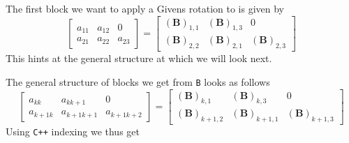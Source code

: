 \documentclass{article}
\begin{document}
The first block we want to apply a Givens rotation to is given by 
\begin{equation*}
    \begin{bmatrix}
        a_{11} & a_{12} & 0 \\
        a_{21} & a_{22} & a_{23}
    \end{bmatrix} = 
    \begin{bmatrix}
        \left(\mathbf{B}\right)_{1,1} & \left(\mathbf{B}\right)_{1,3} & 0 \\
        \left(\mathbf{B}\right)_{2,2} & \left(\mathbf{B}\right)_{2,1} & \left(\mathbf{B}\right)_{2,3}
    \end{bmatrix}
\end{equation*}
This hints at the general structure at which we will look next. 

\pagebreak
\noindent The general structure of blocks we get from \verb|B| looks as follows
\begin{equation*}
     \begin{bmatrix}
        a_{kk} & a_{kk+1} & 0 \\
        a_{k+1k} & a_{k+1k+1} & a_{k+1k+2}
    \end{bmatrix} = 
    \begin{bmatrix}
        \left(\mathbf{B}\right)_{k,1} & \left(\mathbf{B}\right)_{k,3} & 0 \\
        \left(\mathbf{B}\right)_{k+1,2} & \left(\mathbf{B}\right)_{k+1,1} & \left(\mathbf{B}\right)_{k+1,3}
    \end{bmatrix}
\end{equation*}
Using \verb|C++| indexing we thus get
\end{document}
